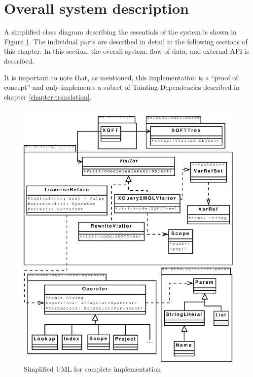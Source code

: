 \section{Overall system description}
A simplified class diagram describing the essentials of the system is shown in
Figure \ref{fig:impl:sys:uml_complete}. The individual parts are described in
detail in the following sections of this chapter. In this section, the overall
system, flow of data, and external API is described.

It is important to note that, as mentioned, this implementation is a ``proof of
concept'' and only implements a subset of Tainting Dependencies described in chapter
\ref{chapter:translation}.

\begin{figure}[!htp]
\begin{center}
\includegraphics[scale=0.43]{diagrams/complete_uml}
  \caption{Simplified UML for complete implementation}
  \label{fig:impl:sys:uml_complete}
\end{center}
\end{figure}

